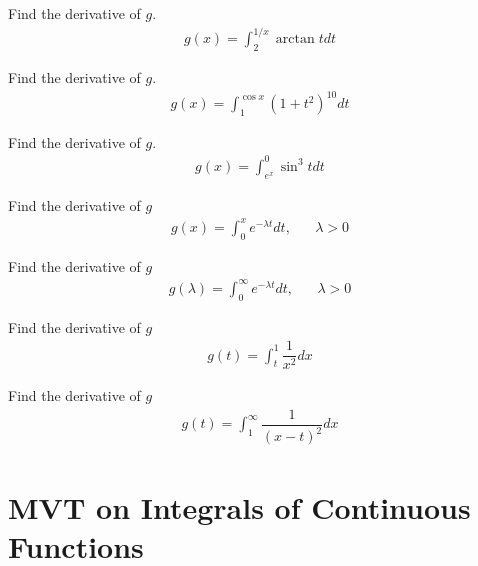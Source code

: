 \begin{exercise}
Find the derivative of $g$.
\begin{align*}
    g(x) = \int_{2}^{1/x} \arctan t dt
\end{align*}
\end{exercise}

\begin{exercise}
Find the derivative of $g$.
\begin{align*}
    g(x) = \int_{1}^{\cos x} (1 + t^{2})^{10} dt
\end{align*}
\end{exercise}

\begin{exercise}
Find the derivative of $g$.
\begin{align*}
    g(x) = \int_{e^{x}}^{0} \sin^{3} t dt
\end{align*}
\end{exercise}

\begin{exercise}
Find the derivative of $g$
\begin{align*}
    g(x) = \int_{0}^{x} e^{-\lambda t} dt, \hspace{20pt} \lambda > 0
\end{align*}
\end{exercise}

\begin{exercise}
Find the derivative of $g$
\begin{align*}
    g(\lambda) = \int_{0}^{\infty} e^{-\lambda t} dt, \hspace{20pt} \lambda > 0
\end{align*}
\end{exercise}

\begin{exercise}
Find the derivative of $g$
\begin{align*}
    g(t) = \int_{t}^{1} \dfrac{1}{x^{2}} dx
\end{align*}
\end{exercise}

\begin{exercise}
Find the derivative of $g$
\begin{align*}
    g(t) = \int_{1}^{\infty} \dfrac{1}{(x-t)^{2}} dx
\end{align*}
\end{exercise}

\newpage
\section{MVT on Integrals of Continuous Functions}

